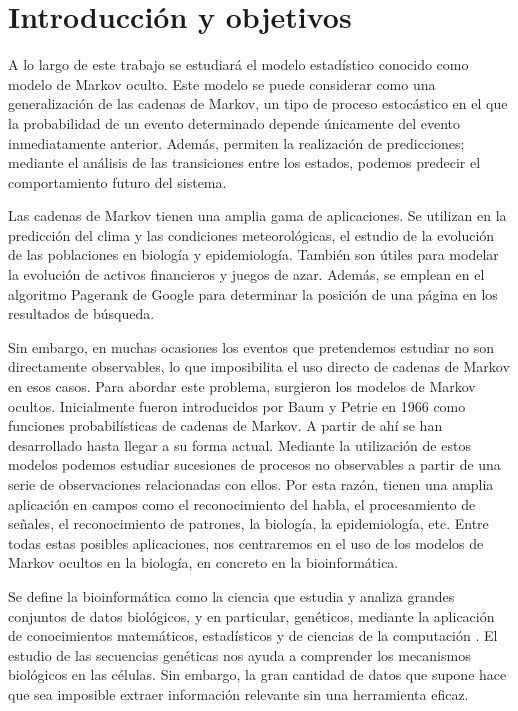 \chapter*{Introducción y objetivos}

A lo largo de este trabajo se estudiará el modelo estadístico conocido como modelo de Markov oculto. Este modelo se puede considerar como una generalización de las cadenas de Markov, un tipo de proceso estocástico en el que la probabilidad de un evento determinado depende únicamente del evento inmediatamente anterior. Además, permiten la realización de predicciones; mediante el análisis de las transiciones entre los estados, podemos predecir el comportamiento futuro del sistema. 

Las cadenas de Markov tienen una amplia gama de aplicaciones. Se utilizan en la predicción del clima y las condiciones meteorológicas, el estudio de la evolución de las poblaciones en biología y epidemiología. También son útiles para modelar la evolución de activos financieros y juegos de azar. Además, se emplean en el algoritmo Pagerank de Google para determinar la posición de una página en los resultados de búsqueda.

Sin embargo, en muchas ocasiones los eventos que pretendemos estudiar no son directamente observables, lo que imposibilita el uso directo de cadenas de Markov en esos casos. Para abordar este problema, surgieron los modelos de Markov ocultos. Inicialmente fueron introducidos por Baum y Petrie en 1966 \cite{Baum} como funciones probabilísticas de cadenas de Markov. A partir de ahí se han desarrollado hasta llegar a su forma actual. Mediante la utilización de estos modelos podemos estudiar sucesiones de procesos no observables a partir de una serie de observaciones relacionadas con ellos. Por esta razón, tienen una amplia aplicación en campos como el reconocimiento del habla, el procesamiento de señales, el reconocimiento de patrones, la biología, la epidemiología, etc. Entre todas estas posibles aplicaciones, nos centraremos en el uso de los modelos de Markov ocultos en la biología, en concreto en la bioinformática. 

Se define la bioinformática como la ciencia que estudia y analiza grandes conjuntos de datos biológicos, y en particular, genéticos, mediante la aplicación de conocimientos matemáticos, estadísticos y de ciencias de la computación \cite{Warren}. El estudio de las secuencias genéticas nos ayuda a comprender los mecanismos biológicos en las células. Sin embargo, la gran cantidad de datos que supone hace que sea imposible extraer información relevante sin una herramienta eficaz. 

